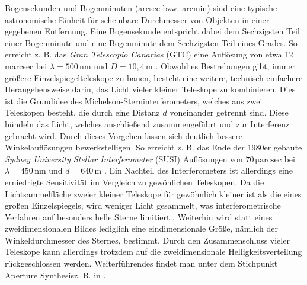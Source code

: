 Bogensekunden und Bogenminuten (arcsec bzw. arcmin) sind eine typische astronomische Einheit für scheinbare Durchmesser von Objekten in einer gegebenen Entfernung. 
Eine Bogensekunde entspricht dabei dem Sechzigsten Teil einer Bogenminute und eine Bogenminute dem Sechzigsten Teil eines Grades. 
So erreicht z. B. das \emph{Gran Telescopio Canarias} (GTC) eine Auflösung von etwa 12\,marcsec bei $\lambda=500\,\mathrm{nm}$ und $D=10{,}4\,\mathrm{m}$ \cite{GranTelescopioCANARIAS}. 
Obwohl es Bestrebungen gibt, immer größere Einzelspiegelteleskope zu bauen, besteht eine weitere, technisch einfachere Herangehensweise darin, das Licht vieler kleiner Teleskope zu kombinieren. 
Dies ist die Grundidee des Michelson-Sterninterferometers, welches aus zwei Teleskopen besteht, die durch eine Distanz $d$ voneinander getrennt sind. 
Diese bündeln das Licht, welches anschließend zusammengeführt und zur Interferenz gebracht wird. 
Durch dieses Vorgehen lassen sich deutlich bessere Winkelauflösungen bewerkstelligen. 
So erreicht z. B. das Ende der 1980er gebaute \emph{Sydney University Stellar Interferometer} (SUSI) Auflösungen von $70\,\mathrm{\mu arcsec}$ bei $\lambda=450\,\mathrm{nm}$ und $d=640\,\mathrm{m}$ \cite{davisSydneyUniversityStellar1999}. 
Ein Nachteil des Interferometers ist allerdings eine erniedrigte Sensitivität im Vergleich zu gewöhlichen Teleskopen. 
Da die Lichtsammelfläche zweier kleiner Teleskope für gewöhnlich kleiner ist als die eines großen Einzelspiegels, wird weniger Licht gesammelt, was interferometrische Verfahren auf besonders helle Sterne limitiert \cite{foxQuantumOpticsIntroduction2006}. 
Weiterhin wird statt eines zweidimensionalen Bildes lediglich eine eindimensionale Größe, nämlich der Winkeldurchmesser des Sternes, bestimmt. 
Durch den Zusammenschluss vieler Teleskope kann allerdings trotzdem auf die zweidimensionale Helligkeitsverteilung rückgeschlossen werden. 
Weiterführendes findet man unter dem Stichpunkt \glqq Aperture Synthesis\grqq\;z. B. in \cite[Kap. 10]{burkeIntroductionRadioAstronomy2019}. \\

